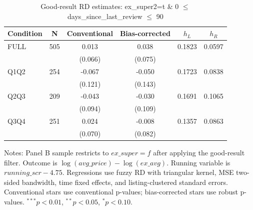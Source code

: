 \begin{table}[!htbp]
\centering
\caption{Good-result RD estimates: ex\_super2=t \& 0 $\leq$ days\_since\_last\_review $\leq$ 90}
\label{tab:good_result_days_since_last_review_90}
\begin{tabular}{lccccc}
\hline
Condition & N & Conventional & Bias-corrected & $h_L$ & $h_R$ \\
\hline
FULL & 505 & 0.013 & 0.038 & 0.1823 & 0.0597 \\
 &  & (0.066) & (0.075) &  &  \\
Q1Q2 & 254 & -0.067 & -0.050 & 0.1723 & 0.0838 \\
 &  & (0.121) & (0.143) &  &  \\
Q2Q3 & 209 & -0.043 & -0.030 & 0.1691 & 0.1065 \\
 &  & (0.094) & (0.109) &  &  \\
Q3Q4 & 251 & 0.024 & -0.008 & 0.1357 & 0.0863 \\
 &  & (0.070) & (0.082) &  &  \\
\hline
\end{tabular}
\begin{flushleft}
\footnotesize Notes: Panel B sample restricts to $ex\_super=f$ after applying the good-result filter. Outcome is $\log(avg\_price)-\log(ex\_avg)$. Running variable is $running\_scr-4.75$. Regressions use fuzzy RD with triangular kernel, MSE two-sided bandwidth, time fixed effects, and listing-clustered standard errors. Conventional stars use conventional p-values; bias-corrected stars use robust p-values. $^{***}p<0.01$, $^{**}p<0.05$, $^{*}p<0.10$.
\end{flushleft}
\end{table}

